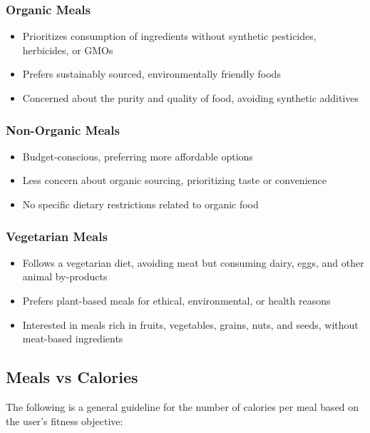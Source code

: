 \documentclass{article}
\begin{document}
\subsubsection{Organic Meals}
\begin{itemize}
    \item Prioritizes consumption of ingredients without synthetic pesticides, herbicides, or GMOs
    \item Prefers sustainably sourced, environmentally friendly foods
    \item Concerned about the purity and quality of food, avoiding synthetic additives
\end{itemize}

\subsubsection{Non-Organic Meals}
\begin{itemize}
    \item Budget-conscious, preferring more affordable options
    \item Less concern about organic sourcing, prioritizing taste or convenience
    \item No specific dietary restrictions related to organic food
\end{itemize}

\subsubsection{Vegetarian Meals}
\begin{itemize}
    \item Follows a vegetarian diet, avoiding meat but consuming dairy, eggs, and other animal by-products
    \item Prefers plant-based meals for ethical, environmental, or health reasons
    \item Interested in meals rich in fruits, vegetables, grains, nuts, and seeds, without meat-based ingredients
\end{itemize}

\subsection{Meals vs Calories}
The following is a general guideline for the number of calories per meal based on the user's fitness objective:
\end{document}

